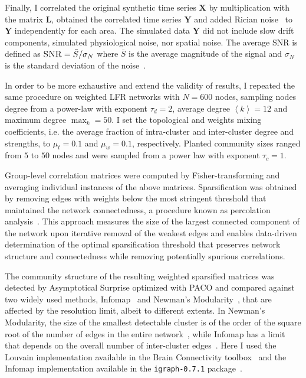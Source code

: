 Finally, I correlated the original synthetic time series $\mathbf{X}$ by multiplication with the matrix $\mathbf{L}$, obtained the correlated time series $\mathbf{Y}$ and added Rician noise~\cite{Gudbjartsson1995} to $\mathbf{Y}$ independently for each area.
The simulated data $\mathbf{Y}$ did not include slow drift components, simulated physiological noise, nor spatial noise.
The average SNR is defined as $\textsc{SNR}=\bar{S}/\sigma_N$ where $\bar{S}$ is the average magnitude of the signal and $\sigma_N$ is the standard deviation of the noise~\cite{kruger2011}.

In order to be more exhaustive and extend the validity of results, I repeated the same procedure on weighted LFR networks with $N=600$ nodes, sampling nodes degree from a power-law with exponent $\tau_d=2$, average degree $\left<k\right>=12$ and maximum degree $\max_k=50$.
I set the topological and weights mixing coefficients, i.e. the average fraction of intra-cluster and inter-cluster degree and strengths, to $\mu_t=0.1$ and $\mu_w=0.1$, respectively.
Planted community sizes ranged from $5$ to $50$ nodes and were sampled from a power law with exponent $\tau_c=1$.

Group-level correlation matrices were computed by Fisher-transforming and averaging individual instances of the above matrices.
Sparsification was obtained by removing edges with weights below the most stringent threshold that maintained the network connectedness, a procedure known as percolation analysis~\cite{gallos2012,bardella2016a,alexander-bloch2010}.
This approach measures the size of the largest connected component of the network upon iterative removal of the weakest edges and enables data-driven determination of the optimal sparsification threshold that preserves network structure and connectedness while removing potentially spurious correlations.

The community structure of the resulting weighted sparsified matrices was detected by Asymptotical Surprise optimized with PACO and compared against two widely used methods, Infomap~\cite{rosvall2008} and Newman's Modularity~\cite{blondel2008,newman2006}, that are affected by the resolution limit, albeit to different extents.
In Newman's Modularity, the size of the smallest detectable cluster is of the order of the square root of the number of edges in the entire network~\cite{fortunato2007}, while Infomap has a limit that depends on the overall number of inter-cluster edges~\cite{kawamoto2015}.
Here I used the Louvain implementation available in the Brain Connectivity toolbox~\cite{rubinov2010} and the Infomap implementation available in the \texttt{igraph-0.7.1} package~\cite{igraph2006}.

